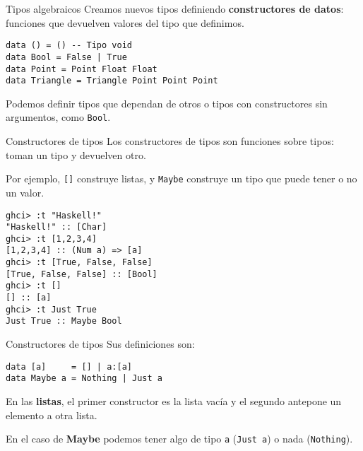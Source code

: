 \begin{frame}[fragile]{Tipos algebraicos}
  Creamos nuevos tipos definiendo \textbf{constructores de datos}: funciones que
  devuelven valores del tipo que definimos. %

  \espacio

  \begin{lstlisting}
data () = () -- Tipo void
data Bool = False | True
data Point = Point Float Float
data Triangle = Triangle Point Point Point
  \end{lstlisting}

  \espacio

  Podemos definir tipos que dependan de otros
  o tipos con constructores sin argumentos, como \texttt{Bool}.
\end{frame}

\begin{frame}[fragile]{Constructores de tipos}
  Los constructores de tipos son funciones sobre tipos: toman un tipo y devuelven otro.

  \espacio

  Por ejemplo, \texttt{[]} construye listas, y \texttt{Maybe} construye un tipo
  que puede tener o no un valor.

  \begin{lstlisting}
ghci> :t "Haskell!"
"Haskell!" :: [Char]
ghci> :t [1,2,3,4]
[1,2,3,4] :: (Num a) => [a]
ghci> :t [True, False, False]
[True, False, False] :: [Bool]
ghci> :t []
[] :: [a]
ghci> :t Just True
Just True :: Maybe Bool
  \end{lstlisting}
\end{frame}

\begin{frame}[fragile]{Constructores de tipos}
  Sus definiciones son:

  \espacio

  \begin{lstlisting}
data [a]     = [] | a:[a]
data Maybe a = Nothing | Just a
  \end{lstlisting}

  \espacio

  En las \textbf{listas}, el primer constructor es la lista vacía y
  el segundo antepone un elemento a otra lista.

  \espacio

  En el caso de \textbf{Maybe} podemos tener algo de tipo \texttt{a} (\texttt{Just a})
  o nada (\texttt{Nothing}).
\end{frame}
